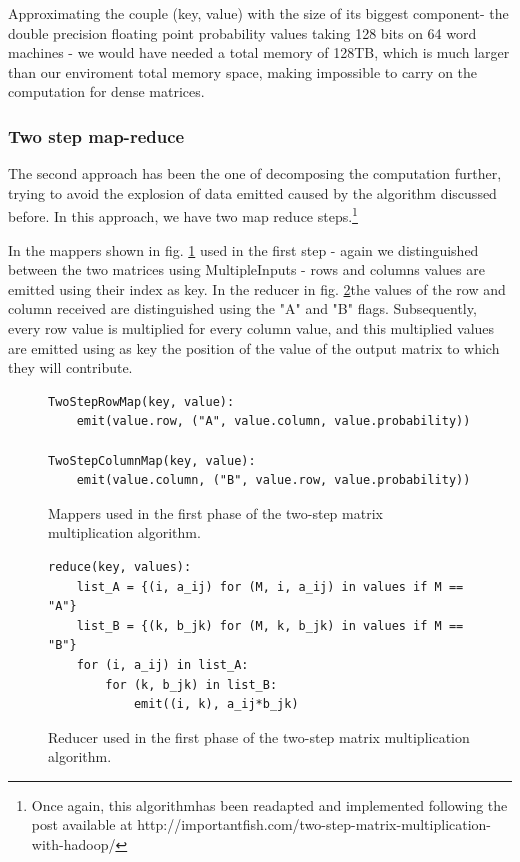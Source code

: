Approximating the couple (key, value) with the size of its biggest component-
the double precision floating point probability values taking 128 bits on 64 word
machines - we would have needed a total memory of 128TB, which is much larger than
our enviroment total memory space, making impossible to carry on the computation
for dense matrices.

\subsubsection{Two step map-reduce}
The second approach has been the one of decomposing the computation further, trying to avoid
the explosion of data emitted caused by the algorithm discussed before.
In this approach, we have two map reduce steps.\footnote{Once again, this algorithmhas been readapted and implemented
following the post available at http://importantfish.com/two-step-matrix-multiplication-with-hadoop/}

In the mappers shown in fig. \ref{fig:twoStep1Map} used in the first step - again we distinguished between the two matrices using MultipleInputs - rows and columns values are emitted using their index as key.
In the reducer in fig. \ref{fig:twoStep1Reducer}the values of the row and column received are distinguished using the "A" and "B" flags. Subsequently,
every row value is multiplied for every column value, and this multiplied values are emitted using as key
the position of the value of the output matrix to which they will contribute. %
\begin{figure}
\begin{verbatim}
TwoStepRowMap(key, value):
    emit(value.row, ("A", value.column, value.probability))

TwoStepColumnMap(key, value):
    emit(value.column, ("B", value.row, value.probability))
\end{verbatim}
\caption{Mappers used in the first phase of the two-step matrix multiplication algorithm.}
\label{fig:twoStep1Map}
\end{figure}
\begin{figure}
\begin{verbatim}
reduce(key, values):
    list_A = {(i, a_ij) for (M, i, a_ij) in values if M == "A"}
    list_B = {(k, b_jk) for (M, k, b_jk) in values if M == "B"}
    for (i, a_ij) in list_A:
        for (k, b_jk) in list_B:
            emit((i, k), a_ij*b_jk)
\end{verbatim}
\caption{Reducer used in the first phase of the two-step matrix multiplication algorithm.}
\label{fig:twoStep1Reducer}
\end{figure}

